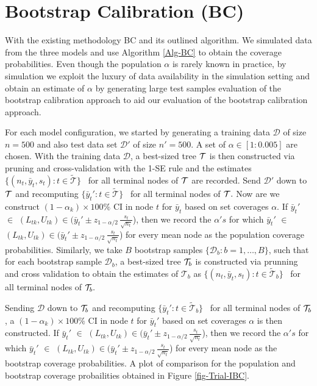 \section{ Bootstrap Calibration (BC)}
With the existing methodology BC and its outlined algorithm. We simulated data from the three models and use Algorithm \ref{Alg-BC} to obtain the coverage probabilities. Even though the population $\alpha$ is rarely known in practice, by simulation we exploit the luxury of data availability in the simulation setting and obtain an estimate of $\alpha$ by generating large test samples evaluation of the bootstrap calibration approach to aid our evaluation of the bootstrap calibration approach.%

For each model configuration, we started by generating a training data $\mathcal{D}$ of size $n=500$ and also test data set $\mathcal{D}'$ of size $n'=500$. A set of $\alpha \in [{1: 0.005}]$ are chosen. With the training data $\mathcal{D}$, a best-sized tree $\mathcal{T}$ is then constructed via pruning and cross-validation with the 1-SE rule \citep{breiman1984classification} and the estimates $\{(n_t, \bar{y}_t, s_t): t \in \widetilde{\mathcal{T}}\}$ \ for all terminal nodes of $\mathcal{T}$ are recorded. Send $\mathcal{D}'$ down to $\mathcal{T}$ and recomputing $\{ \bar{y}_t': t \in \widetilde{\mathcal{T}}\}$ \ for all terminal nodes of $\mathcal{T}.$ Now are we construct $(1-\alpha_k) \times 100\%$ CI in node $t$ for $\bar{y}_t$ based on set coverages $\alpha$. If $\bar{y}_t'$ $\in$ $(L_{tk}, U_{tk}) \in (\bar{y}_t' \pm z_{1-\alpha/2} \, \frac{\displaystyle s_t}{\displaystyle \sqrt{n_t}}$), then we record the $\alpha's$ for which $\bar{y}_t'$ $\in$ $(L_{tk}, U_{tk}) \in (\bar{y}_t' \pm z_{1-\alpha/2} \, \frac{\displaystyle s_t}{\displaystyle \sqrt{n_t}}$)  for every mean node as the population coverage probabilities.\newline
Similarly, we take $B$ bootstrap samples $\{ \mathcal{D}_b: b=1, \ldots, B\}$, such that for each bootstrap sample $\mathcal{D}_b$, a best-sized tree $\mathcal{T}_b$ is constructed  via prunning and cross validation to obtain the estimates of $\mathcal{T}_b$ as $\{(n_t, \bar{y}_t, s_t): t \in \widetilde{\mathcal{T}}_b\}$ \ for all terminal nodes of $\mathcal{T}_b.$

Sending $\mathcal{D}$ down to $\mathcal{T}_b$ and recomputing $\{ \bar{y}_t': t \in \widetilde{\mathcal{T}}_b\}$ \ for all terminal nodes of $\mathcal{T}_b$, a $(1-\alpha_k) \times 100\%$ CI in node $t$ for $\bar{y}_t'$ based on set coverages $\alpha$ is then constructed. If $\bar{y}_t'$ $\in$ $(L_{tk}, U_{tk}) \in (\bar{y}_t' \pm z_{1-\alpha/2} \, \frac{\displaystyle s_t}{\displaystyle \sqrt{n_t}}$), then we record the $\alpha's$ for which $\bar{y}_t'$ $\in$ $(L_{tk}, U_{tk}) \in (\bar{y}_t' \pm z_{1-\alpha/2} \, \frac{\displaystyle s_t}{\displaystyle \sqrt{n_t}}$) for every mean node as the bootstrap coverage probabilities. A plot of comparison for the population and bootstrap coverage probailities obtained in Figure \ref{fig-Trial-IBC}.


